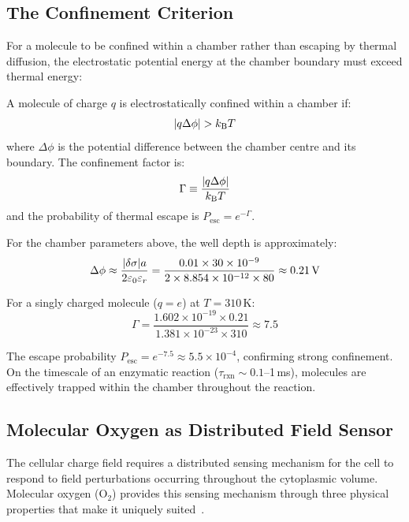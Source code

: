 \subsection{The Confinement Criterion}

For a molecule to be confined within a chamber rather than escaping by thermal diffusion, the electrostatic potential energy at the chamber boundary must exceed thermal energy:

\begin{theorem}
\label{v:thm:confinement}
A molecule of charge $q$ is electrostatically confined within a chamber if:
\begin{equation}
  \abs{q \Delta\phi} > k_{\mathrm{B}} T
  \label{v:eq:confinement}
\end{equation}
where $\Delta\phi$ is the potential difference between the chamber centre and its boundary. The confinement factor is:
\begin{equation}
  \Gamma \equiv \frac{\abs{q \Delta\phi}}{k_{\mathrm{B}} T}
\end{equation}
and the probability of thermal escape is $P_{\mathrm{esc}} = e^{-\Gamma}$.
\end{theorem}

For the chamber parameters above, the well depth is approximately:
\begin{equation}
  \Delta\phi \approx \frac{\abs{\delta\sigma} a}{2 \varepsilon_{0} \varepsilon_r} = \frac{0.01 \times 30 \times 10^{-9}}{2 \times 8.854 \times 10^{-12} \times 80} \approx 0.21\,\mathrm{V}
\end{equation}

For a singly charged molecule ($q = e$) at $T = 310$\,K:
\begin{equation}
  \Gamma = \frac{1.602 \times 10^{-19} \times 0.21}{1.381 \times 10^{-23} \times 310} \approx 7.5
\end{equation}

The escape probability $P_{\mathrm{esc}} = e^{-7.5} \approx 5.5 \times 10^{-4}$, confirming strong confinement. On the timescale of an enzymatic reaction ($\tau_{\mathrm{rxn}} \sim 0.1$--1\,ms), molecules are effectively trapped within the chamber throughout the reaction.

\subsection{Molecular Oxygen as Distributed Field Sensor}

The cellular charge field requires a distributed sensing mechanism for the cell to respond to field perturbations occurring throughout the cytoplasmic volume. Molecular oxygen ($\mathrm{O}_2$) provides this sensing mechanism through three physical properties that make it uniquely suited~\cite{Pauling1931,Ochiai2008}.

